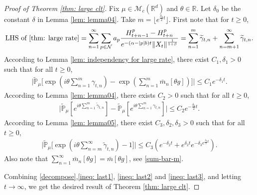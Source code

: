 \documentclass[12pt,a4paper]{amsart}
\theoremstyle{plain}
\theoremstyle{definition}
\numberwithin{equation}{section}
\begin{document}
\begin{proof}[Proof of Theorem \ref{thm: large clt}]
    Fix $\mu \in \mathcal M_c(\mathbb R^d)$ and $\theta \in \mathbb R$.
    Let $\delta_0$ be the constant $\delta$ in Lemma \ref{lem: lemma04}.
    Take $m=\lfloor e^{\frac{\delta_0}{2}t}\rfloor$.
    First note that for $t\ge 0$,
\begin{align}\label{decompose}
    \text{LHS of \eqref{thm: large rate}}
    =\sum_{n=1}^{\infty}\sum_{p\in \mathcal{N}}a_p\frac{H^p_{t+n-1}-H^p_{t+n}}{e^{-(\alpha-|p|b)t}\|X_t\|^{\frac{1}{1+\beta}}}=\sum_{n=1}^m\widetilde{\gamma}_{t,n}+\sum_{n=m+1}^{\infty}\widetilde{\gamma}_{t,n}.
\end{align}
    According to Lemma \ref{lem: independency for large rate}, there exist $C_1,\delta_1>0$ such that for all $t\geq 0$,
\begin{align}\label{ineq: last1}
    \Big|\widetilde{\mathbb{P}}_{\mu}\Big[\exp(i\theta\sum_{n=1}^m\gamma_{t,n})-\exp(\sum_{n=1}^m\bar{m}_n[\theta g])\Big]
    \Big|\leq C_1 e^{-\delta_1 t}.
\end{align}
    According to Lemma \ref{lem: lemma04}, there exists $C_2>0$ such that for all $t\geq 0$,
\begin{align}\label{ineq: last2}
    \Big|\widetilde{\mathbb{P}}_{\mu}[e^{i\theta\sum_{n=1}^m \widetilde{\gamma}_{t,n}}]-\widetilde{\mathbb{P}}_{\mu}[e^{i\theta \sum_{n=1}^m\gamma_{t,n}}]\Big|\leq C_2  e^{-\frac{\delta_0}{2} t}.
 \end{align}
    According to Lemma \ref{lem: lemma05}, there exist $C_3,\delta_2,\delta_3>0$ such that for all $t\geq 0$,
\begin{align}\label{ineq: last3}
    \Big|\widetilde{\mathbb{P}}_{\mu}\Big[\exp(i\theta \sum_{n=m}^{\infty}\widetilde{\gamma}_{t,n})-1\Big]\Big|\leq C_3(e^{-\delta_2 t}+e^{\delta_2 t}e^{-\delta_3 e^{\frac{\delta_0}{2}t}}).
\end{align}
    Also note that $\sum_{n=1}^\infty\bar{m}_n[\theta g]=\bar{m}[\theta g]$, see \eqref{sum-bar-m}.

    Combining \eqref{decompose},\eqref{ineq: last1}, \eqref{ineq: last2} and \eqref{ineq: last3}, and letting $t\to\infty$, we get the desired result of Theorem \ref{thm: large clt}.
\end{proof}



\appendix
\section{ }
\end{document}
